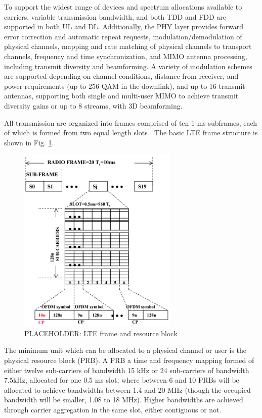 To support the widest range of devices and spectrum allocations available to carriers, variable transmission bandwidth, and both TDD and FDD are supported in both UL and DL. Additionally, the PHY layer provides forward error correction and automatic repeat requests, modulation/demodulation of physical channels, mapping and rate matching of physical channels to transport channels, frequency and time synchronization, and MIMO antenna processing, including transmit diversity and beamforming.  A variety of modulation schemes are supported depending on channel conditions, distance from receiver, and power requirements (up to 256 QAM in the downlink), and up to 16 transmit antennas, supporting both single and multi-user MIMO to achieve transmit diversity gains or up to 8 streams, with 3D beamforming.

All transmission are organized into frames comprised of ten 1 ms subframes, each of which is formed from two equal length slots \cite{tr36211}. The basic LTE frame structure is shown in Fig. \ref{lte:frame}.
\begin{figure}[!t]
	\centering
	\includegraphics[width=3in]{figures3/lte-frame}
	\caption{PLACEHOLDER: LTE frame and resource block}
	\label{lte:frame}
\end{figure}
The minimum unit which can be allocated to a physical channel or user is the physical resource block (PRB).  A PRB a time and frequency mapping formed of either twelve sub-carriers of bandwidth 15 kHz or 24 sub-carriers of bandwidth 7.5kHz, allocated for one 0.5 ms slot, where between 6 and 10 PRBs will be allocated to achieve bandwidths between 1.4 and 20 MHz (though the occupied bandwidth will be smaller, 1.08 to 18 MHz).  Higher bandwidths are achieved through carrier aggregation in the same slot, either contiguous or not.  

